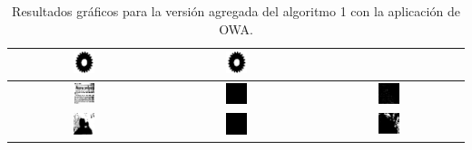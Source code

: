 \begin{table}
\begin{tabular}{c|c|c}
\includegraphics[width=0.15\textwidth]{img/res/e6/alg1agregadoowa202.jpg} &
\includegraphics[width=0.15\textwidth]{img/res/e6/alg1agregadoowa302.jpg} \\\hline
\includegraphics[width=0.15\textwidth]{img/res/e6/alg1agregadoowa109.jpg} &
\includegraphics[width=0.15\textwidth]{img/res/e6/alg1agregadoowa209.jpg} &
\includegraphics[width=0.15\textwidth]{img/res/e6/alg1agregadoowa309.jpg} \\\hline
\includegraphics[width=0.15\textwidth]{img/res/e6/alg1agregadoowa107.jpg} &
\includegraphics[width=0.15\textwidth]{img/res/e6/alg1agregadoowa207.jpg} &
\includegraphics[width=0.15\textwidth]{img/res/e6/alg1agregadoowa307.jpg} \\\hline
\end{tabular}
\caption{Resultados gráficos para la versión agregada del algoritmo 1 con la aplicación de OWA. \label{tab:resultexp6imagenes}}
\end{table}


